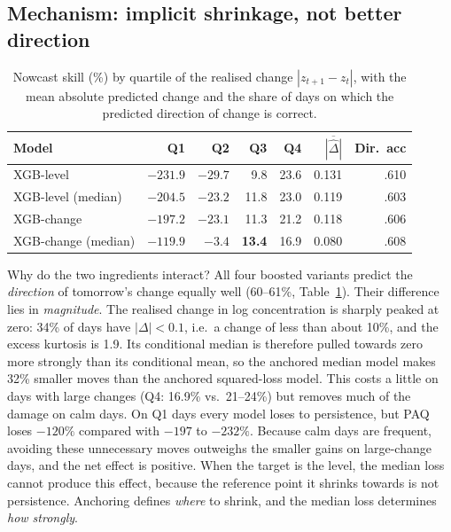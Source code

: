 \documentclass[conference]{IEEEtran}
\begin{document}
\subsection{Mechanism: implicit shrinkage, not better direction}\label{sec:mech}
\begin{table}[t]
\centering
\caption{Nowcast skill (\%) by quartile of the realised change $|z_{t+1}-z_t|$, with the mean absolute predicted change and the share of days on which the predicted direction of change is correct.}
\label{tab:mech}
\setlength{\tabcolsep}{3pt}
\begin{tabular}{lrrrrrr}
\toprule
Model & Q1 & Q2 & Q3 & Q4 & $\overline{|\hat\Delta|}$ & Dir.\ acc \\
\midrule
XGB-level            & $-231.9$ & $-29.7$ & 9.8  & 23.6 & 0.131 & .610 \\
XGB-level (median)   & $-204.5$ & $-23.2$ & 11.8 & 23.0 & 0.119 & .603 \\
XGB-change           & $-197.2$ & $-23.1$ & 11.3 & 21.2 & 0.118 & .606 \\
XGB-change (median)  & $\mathbf{-119.9}$ & $\mathbf{-3.4}$ & \textbf{13.4} & 16.9 & 0.080 & .608 \\
\bottomrule
\end{tabular}
\end{table}

Why do the two ingredients interact? All four boosted variants predict the
\emph{direction} of tomorrow's change equally well (60--61\%, Table~\ref{tab:mech}).
Their difference lies in \emph{magnitude}. The realised change in log concentration is sharply peaked
at zero: 34\% of days have $|\Delta|<0.1$, i.e.\ a change of less than about 10\%, and the excess
kurtosis is 1.9. Its conditional median is therefore pulled towards zero more strongly than its
conditional mean, so the anchored median model makes 32\% smaller moves than the anchored
squared-loss model. This costs a little on days with large changes (Q4: 16.9\% vs.\ 21--24\%) but
removes much of the damage on calm days. On Q1 days every model loses to persistence, but PAQ loses
$-120\%$ compared with $-197$ to $-232\%$. Because calm days are frequent, avoiding these unnecessary moves outweighs
the smaller gains on large-change days, and the net effect is positive. When the target is the level, the median loss
cannot produce this effect, because the reference point it shrinks towards is not persistence.
Anchoring defines \emph{where} to shrink, and the median loss determines \emph{how strongly}.
\end{document}
